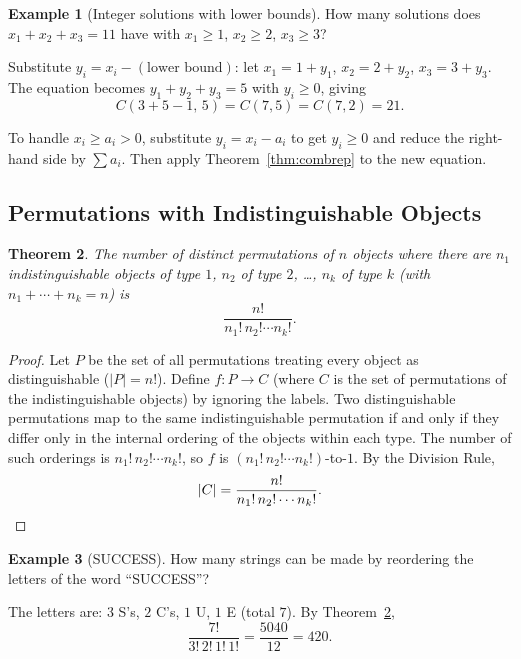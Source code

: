 \documentclass[11pt, a4paper, notitlepage]{report}
\newtheorem{theorem}{Theorem}[section]
\theoremstyle{definition}
\newtheorem{example}[theorem]{Example}
\theoremstyle{remark}
\begin{document}
\begin{example}[Integer solutions with lower bounds]
How many solutions does $x_1 + x_2 + x_3 = 11$ have with $x_1 \geq 1$, $x_2 \geq 2$,
$x_3 \geq 3$?

Substitute $y_i = x_i - (\text{lower bound})$: let $x_1 = 1+y_1$, $x_2 = 2+y_2$,
$x_3 = 3+y_3$.  The equation becomes $y_1 + y_2 + y_3 = 5$ with $y_i \geq 0$, giving
\[
  C(3+5-1,\,5) = C(7,5) = C(7,2) = 21.
\]
\end{example}

\begin{examtip}[title={Exam Tip: Lower-Bound Substitution}]
To handle $x_i \geq a_i > 0$, substitute $y_i = x_i - a_i$ to get $y_i \geq 0$ and reduce
the right-hand side by $\sum a_i$.  Then apply Theorem~\ref{thm:combrep} to the new equation.
\end{examtip}

\subsection{Permutations with Indistinguishable Objects}

\begin{theorem}
\label{thm:indistperm}
The number of distinct permutations of $n$ objects where there are $n_1$ indistinguishable
objects of type $1$, $n_2$ of type $2$, \ldots, $n_k$ of type $k$ (with $n_1 + \cdots + n_k = n$) is
\[
  \frac{n!}{n_1!\,n_2!\cdots n_k!}.
\]
\end{theorem}

\begin{proof}
Let $P$ be the set of all permutations treating every object as distinguishable ($|P| = n!$).
Define $f: P \to C$ (where $C$ is the set of permutations of the indistinguishable objects) by
ignoring the labels.  Two distinguishable permutations map to the same indistinguishable
permutation if and only if they differ only in the internal ordering of the objects within each
type.  The number of such orderings is $n_1!\,n_2!\cdots n_k!$, so $f$ is
$(n_1!\,n_2!\cdots n_k!)$-to-$1$.  By the Division Rule,
\[
  |C| = \frac{n!}{n_1!\,n_2!\cdots n_k!}. \qedhere
\]
\end{proof}

\begin{example}[SUCCESS]
How many strings can be made by reordering the letters of the word ``SUCCESS''?

The letters are: $3$ S's, $2$ C's, $1$ U, $1$ E (total $7$).  By Theorem~\ref{thm:indistperm},
\[
  \frac{7!}{3!\,2!\,1!\,1!} = \frac{5040}{12} = 420.
\]
\end{example}
\end{document}
